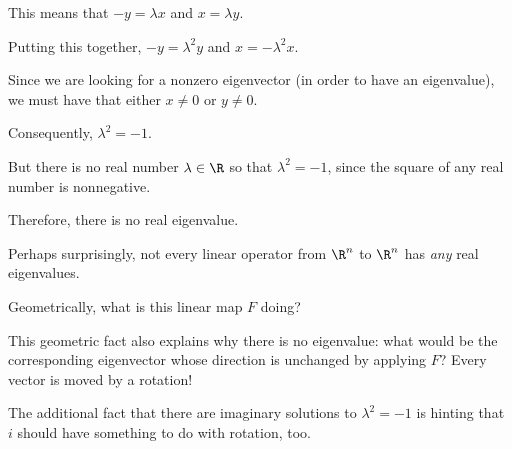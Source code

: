 \documentclass{ximera}
\begin{document}
\begin{question}
\begin{solution}
    \begin{hint}
      This means that $-y = \lambda x$ and $x = \lambda y$.
    \end{hint}

    \begin{hint}
      Putting this together, $-y = \lambda^2 y$ and $x = -\lambda^2 x$.
    \end{hint}

    \begin{hint}
      Since we are looking for a nonzero eigenvector (in order to have an eigenvalue), we must have that either $x \neq 0$ or $y \neq 0$.
    \end{hint}

    \begin{hint}
      Consequently, $\lambda^2 = -1$.
    \end{hint}

    \begin{hint}
      But there is no real number $\lambda \in \R$ so that $\lambda^2 = -1$, since the square of any real number is nonnegative.
    \end{hint}

    \begin{hint}
      Therefore, there is no real eigenvalue.
    \end{hint}

    \begin{multiple-choice}
    \end{multiple-choice}
  \end{solution}

  Perhaps surprisingly, not every linear operator from $\R^n$ to $\R^n$ has \textit{any} real eigenvalues.

  Geometrically, what is this linear map $F$ doing?
  \begin{solution}
    \begin{multiple-choice}
    \end{multiple-choice}
  \end{solution}
    
  This geometric fact also explains why there is no eigenvalue: what
  would be the corresponding eigenvector whose direction is unchanged
  by applying $F$?  Every vector is moved by a rotation!

  The additional fact that there are imaginary solutions to $\lambda^2
  = -1$ is hinting that $i$ should have something to do with rotation,
  too.
\end{question}
\end{document}
